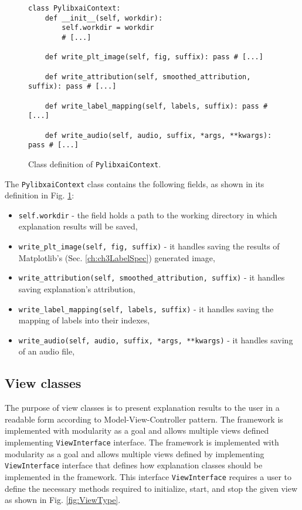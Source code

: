 \documentclass[
    bindingoffset=5mm,  %
    footnoteindent=3mm, %
    hyphenation=true    %
]{src/wut-thesis}
\begin{document}
\begin{figure}%
\begin{verbatim}
class PylibxaiContext:
    def __init__(self, workdir):
        self.workdir = workdir
        # [...]
    
    def write_plt_image(self, fig, suffix): pass # [...]
    
    def write_attribution(self, smoothed_attribution, suffix): pass # [...]

    def write_label_mapping(self, labels, suffix): pass # [...]
    
    def write_audio(self, audio, suffix, *args, **kwargs): pass # [...]
\end{verbatim}
\caption{Class definition of \texttt{PylibxaiContext}.}
\label{fig:PylibxaiContext}
\end{figure}

The \texttt{PylibxaiContext} class contains the following fields, as shown in its definition in Fig. \ref{fig:PylibxaiContext}:

\begin{itemize}
    \item \texttt{self.workdir} - the field holds a path to the working directory in which explanation results will be saved,
    \item \texttt{write_plt_image(self, fig, suffix)} - it handles saving the results of Matplotlib's (Sec. \ref{ch:ch3LabelSpec}) generated image,
    \item \texttt{write_attribution(self, smoothed_attribution, suffix)} - it handles saving explanation's attribution,
    \item \texttt{write_label_mapping(self, labels, suffix)} - it handles saving the mapping of labels into their indexes,
    \item \texttt{write_audio(self, audio, suffix, *args, **kwargs)} - it handles saving of an audio file,
\end{itemize}

\subsection{View classes}

The purpose of view classes is to present explanation results to the user in a readable form
according to Model-View-Controller pattern. The framework is implemented with modularity as a goal
and allows multiple views defined implementing \texttt{ViewInterface} interface.
The framework is implemented with modularity as a goal and allows multiple views
defined by implementing \texttt{ViewInterface} interface that defines how explanation
classes should be implemented in the framework.
This interface \texttt{ViewInterface} requires a user to define the necessary
methods required to initialize, start, and stop the given view as shown in Fig. \ref{fig:ViewType}.
\end{document}
